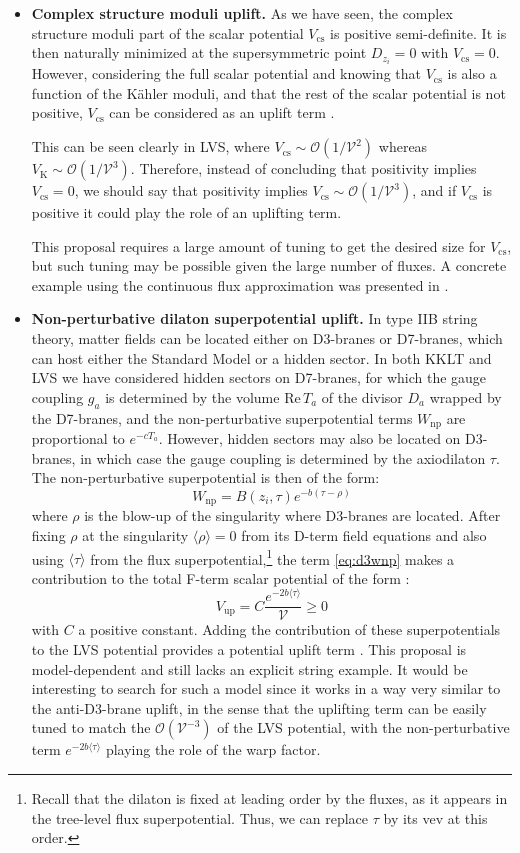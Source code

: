 \documentclass[12pt,a4wide]{article}
\def\O{\mathcal{O}}
\def\V{\mathcal{V}}
\def\be{\begin{equation}}
\def\ee{\end{equation}}
\begin{document}
\begin{itemize}
\item{\bf Complex structure moduli uplift.}
As we have seen, the complex structure moduli part of the scalar potential $V_{\text{cs}}$ is positive semi-definite. It is then naturally minimized at the supersymmetric point  
$D_{z_i}=0$ with $V_{\text{cs}}=0$. However, considering the full scalar potential and knowing that $V_{\text{cs}}$ is also a function of the K\"ahler moduli, and that the rest of the scalar potential is not positive, $V_{\text{cs}}$ can be considered as an uplift term \cite{Saltman:2004sn,Gallego:2017dvd,Krippendorf:2023idy}.

This can be seen clearly in LVS, where $V_{\text{cs}}\sim \O\left(1/\V^2\right)$ whereas $V_{\text{K}}\sim \O\left(1/\V^3\right)$. Therefore, instead of concluding that positivity implies $V_{\text{cs}}=0$, we should say that positivity implies 
$V_{\text{cs}}\sim \O\left(1/\V^3\right)$, and if $V_{\text{cs}}$ is positive it could play the role of an uplifting term.

This proposal requires a large amount of tuning to get the desired size for $V_{\text{cs}}$, but such tuning may be possible given the large number of fluxes. A concrete example using the continuous flux approximation was presented in 
\cite{Gallego:2017dvd}.

\item{\bf Non-perturbative dilaton superpotential uplift.}
In type IIB string theory, matter fields can be located either on D3-branes or D7-branes, which can host either the Standard Model or a hidden sector.  In both KKLT and LVS we have considered hidden sectors on D7-branes, for which the gauge coupling $g_a$ is determined by the volume $\text{Re}\,T_a$ of the divisor $D_a$ wrapped by the D7-branes,
and the non-perturbative superpotential terms $W_{\text{np}}$ are proportional to 
$e^{-cT_a}$. 
However, hidden sectors may also be located on D3-branes, in which case
the gauge coupling is determined by the axiodilaton $\tau$. 
The non-perturbative superpotential is then of the form:
\be \label{eq:d3wnp}
W_{\text{np}}= B(z_i,\tau)e^{-b(\tau-\rho)}
\ee
where $\rho$ is the blow-up of the singularity where D3-branes are located. After fixing $\rho$ at the singularity $\langle \rho \rangle=0$ from its D-term field equations and also using $\langle \tau \rangle$ from the flux superpotential,\footnote{Recall that the dilaton is fixed at leading order by the fluxes, as it appears in the tree-level flux superpotential.  Thus, we can replace $\tau$ by its vev at this order.} the term \eqref{eq:d3wnp} makes a contribution to the total F-term scalar potential of the form \cite{Cicoli:2015ylx}:
\be
V_{\text{up}}=C \frac{e^{-2b\langle \tau\rangle}}{\V}\geq 0
\ee
with $C$ a positive constant.
Adding the contribution of these superpotentials to the LVS potential provides a potential uplift term \cite{Cicoli:2015ylx}. This proposal is model-dependent and still lacks an explicit string example. It would be interesting to search for such a model since it works in a way very similar to the anti-D3-brane uplift, in the sense that the uplifting term can be easily tuned to match the $\O\left(\V^{-3}\right)$ of the LVS potential, with the non-perturbative term $ e^{-2b\langle \tau \rangle}$ playing the role of the warp factor.



\end{itemize}
\end{document}
